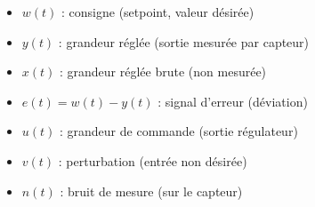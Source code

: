 
\begin{tcolorbox}[colback=ch1blue!5,colframe=ch1blue!75!black,title={Signaux d'un syst\`eme r\'egul\'e}]
\begin{itemize}
  \item $w(t)$ : consigne (setpoint, valeur d\'esir\'ee)
  \item $y(t)$ : grandeur r\'egl\'ee (sortie mesur\'ee par capteur)
  \item $x(t)$ : grandeur r\'egl\'ee brute (non mesur\'ee)
  \item $e(t) = w(t) - y(t)$ : signal d'erreur (d\'eviation)
  \item $u(t)$ : grandeur de commande (sortie r\'egulateur)
  \item $v(t)$ : perturbation (entr\'ee non d\'esir\'ee)
  \item $n(t)$ : bruit de mesure (sur le capteur)
\end{itemize}
\end{tcolorbox}

